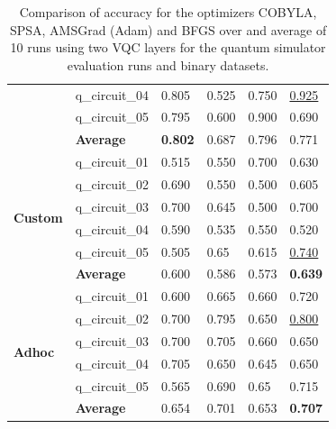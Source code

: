 \begin{table}[!h]
{\begin{tabular}{p{}p{}|p{}p{}p{}p{}}
    		                        & q\_circuit\_04 & 0.805  & 0.525 & 0.750   & \underline{0.925} \\
    		                        & q\_circuit\_05 & 0.795  & 0.600 & 0.900   & 0.690 \\
    		\cline{2-6} 
    		                        & \textbf{Average}      & \textbf{0.802}  & 0.687 & 0.796   & 0.771 \\
    		\hline
    		\multirow{6}{*}{\textbf{Custom}} & q\_circuit\_01 & 0.515  & 0.550 & 0.700   & 0.630 \\
    		                        & q\_circuit\_02 & 0.690  & 0.550 & 0.500   & 0.605 \\
    		                        & q\_circuit\_03 & 0.700  & 0.645 & 0.500   & 0.700 \\
    		                        & q\_circuit\_04 & 0.590  & 0.535 & 0.550  & 0.520 \\
    		                        & q\_circuit\_05 & 0.505  & 0.65 & 0.615   & \underline{0.740} \\
    		\cline{2-6} 
    		                        & \textbf{Average}      & 0.600 & 0.586 & 0.573   & \textbf{0.639} \\
    		\hline 
    		\multirow{6}{*}{\textbf{Adhoc}}  & q\_circuit\_01 & 0.600  & 0.665 & 0.660   & 0.720 \\
    		                        & q\_circuit\_02 & 0.700  & 0.795 & 0.650   & \underline{0.800} \\
    		                        & q\_circuit\_03 & 0.700  & 0.705 & 0.660   & 0.650 \\
    		                        & q\_circuit\_04 & 0.705 & 0.650 & 0.645   & 0.650 \\
    		                        & q\_circuit\_05 & 0.565 & 0.690 & 0.65   & 0.715 \\
    		\cline{2-6} 
    		                        & \textbf{Average} & 0.654  & 0.701 & 0.653  & \textbf{0.707} \\
    		\hline 
    	\end{tabular}
	}
	\caption{Comparison of accuracy for the optimizers COBYLA, SPSA, AMSGrad (Adam) and BFGS over and average of 10 runs using two VQC layers for the quantum simulator evaluation runs and binary datasets.}
	\label{table:accuracy_comparison_binary_dataset_and_optimizers_simulator_runs}
\end{table}

\clearpage

